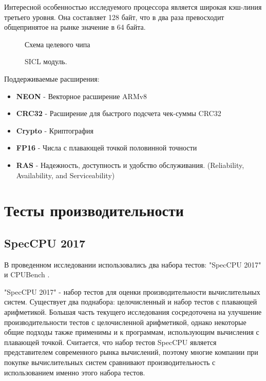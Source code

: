 Интересной особенностью исследуемого процессора является широкая кэш-линия третьего уровня. Она составляет 128 байт, что в два раза превосходит общепринятое на рынке значение в 64 байта. 

\begin{figure}[htbp]
	\centering
	
	\caption{Схема целевого чипа}
	\label{chip1}
\end{figure}
\begin{figure}[htbp]
	\centering
	
	\caption{SICL модуль.}
	\label{chip2}
\end{figure}

Поддерживаемые расширения:
\begin{itemize}
	\item  \textbf{NEON} - Векторное расширение ARMv8
	\item  \textbf{CRC32} - Расширение для быстрого подсчета чек-суммы CRC32
	\item  \textbf{Crypto} - Криптография
	\item  \textbf{FP16} - Числа с плавающей точкой половинной точности
	\item  \textbf{RAS} -  Надежность, доступность и удобство обслуживания. (Reliability, Availability, and Serviceability)
\end{itemize}

\section{Тесты производительности}\label{p1:tests}
\subsection{SpecCPU 2017}\label{p1:tests:spec}
В проведенном исследовании использовались два набора тестов: "SpecCPU 2017"\phantom{ } \cite{bucek2018spec} и CPUBench \cite{lu2023cpubench}. 

"SpecCPU 2017"\phantom{ } - набор тестов для оценки производительности вычислительных систем. Существует два поднабора: целочисленный и набор тестов с плавающей арифметикой. Большая часть текущего исследования сосредоточена на улучшение производительности тестов с целочисленной арифметикой, однако некоторые общие подходы также применимы и к программам, использующим вычисления с плавающей точкой. Считается, что набор тестов SpecCPU является представителем современного рынка вычислений, поэтому многие компании при покупке вычислительных систем сравнивают производительность с использованием именно этого набора тестов. \cite{bucek2018spec}

